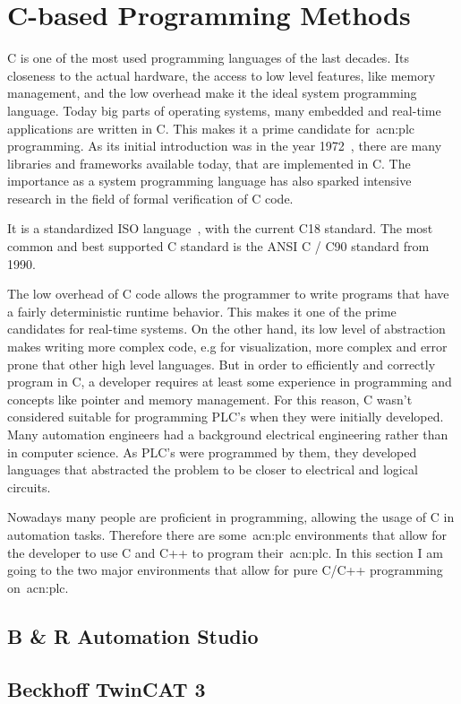 \section{C-based Programming Methods}
\label{sec:c_methods}

C is one of the most used programming languages of the last decades.
Its closeness to the actual hardware, the access to low level features, like memory management, and the low overhead make it the ideal system programming language.
Today big parts of operating systems, many embedded and real-time applications are written in C.
This makes it a prime candidate for~\acrshort{acn:plc} programming.
As its initial introduction was in the year 1972~\cite{10.5555/576122}, there are many libraries and frameworks available today, that are implemented in C.
The importance as a system programming language has also sparked intensive research in the field of formal verification of C code.

It is a standardized ISO language~\cite{ISO:9899:2018}, with the current C18 standard.
The most common and best supported C standard is the ANSI C / C90 standard from 1990.

The low overhead of C code allows the programmer to write programs that have a fairly deterministic runtime behavior.
This makes it one of the prime candidates for real-time systems.
On the other hand, its low level of abstraction makes writing more complex code, e.g for visualization, more complex and error prone that other high level languages.
But in order to efficiently and correctly program in C, a developer requires at least some experience in programming and concepts like pointer and memory management.
For this reason, C wasn't considered suitable for programming PLC's when they were initially developed.
Many automation engineers had a background electrical engineering rather than in computer science.
As PLC's were programmed by them, they developed languages that abstracted the problem to be closer to electrical and logical circuits.

Nowadays many people are proficient in programming, allowing the usage of C in automation tasks.
Therefore there are some~\acrshort{acn:plc} environments that allow for the developer to use C and C++ to program their~\acrshort{acn:plc}.
In this section I am going to the two major environments that allow for pure C/C++ programming on~\acrshort{acn:plc}.

\subsection{B \& R Automation Studio}


\subsection{Beckhoff TwinCAT 3}

